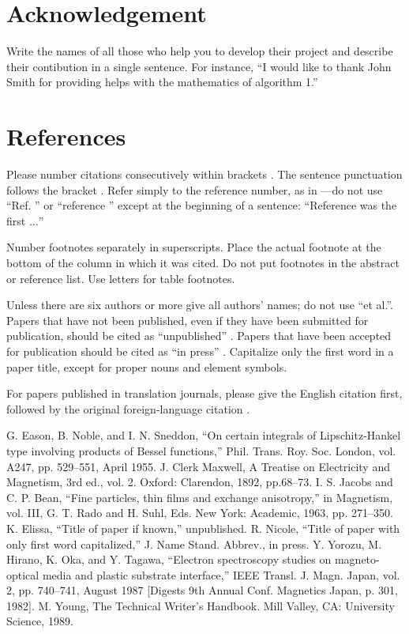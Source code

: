 \documentclass[conference]{IEEEtran}
\begin{document}
\section*{Acknowledgement}

Write the names of all those who help you to develop their project and describe their contibution in a single sentence. For instance, ``I would like to thank John Smith for providing helps with the mathematics of algorithm 1.''


\section*{References}

Please number citations consecutively within brackets \cite{b1}. The 
sentence punctuation follows the bracket \cite{b2}. Refer simply to the reference 
number, as in \cite{b3}---do not use ``Ref. \cite{b3}'' or ``reference \cite{b3}'' except at 
the beginning of a sentence: ``Reference \cite{b3} was the first $\ldots$''

Number footnotes separately in superscripts. Place the actual footnote at the bottom of the column in which it was cited. Do not put footnotes in the abstract or reference list. Use letters for table footnotes.

Unless there are six authors or more give all authors' names; do not use ``et al.''. Papers that have not been published, even if they have been submitted for publication, should be cited as ``unpublished'' \cite{b4}. Papers that have been accepted for publication should be cited as ``in press'' \cite{b5}. Capitalize only the first word in a paper title, except for proper nouns and element symbols.

For papers published in translation journals, please give the English 
citation first, followed by the original foreign-language citation \cite{b6}.

\begin{thebibliography}{00}
 G. Eason, B. Noble, and I. N. Sneddon, ``On certain integrals of Lipschitz-Hankel type involving products of Bessel functions,'' Phil. Trans. Roy. Soc. London, vol. A247, pp. 529--551, April 1955.
 J. Clerk Maxwell, A Treatise on Electricity and Magnetism, 3rd ed., vol. 2. Oxford: Clarendon, 1892, pp.68--73.
 I. S. Jacobs and C. P. Bean, ``Fine particles, thin films and exchange anisotropy,'' in Magnetism, vol. III, G. T. Rado and H. Suhl, Eds. New York: Academic, 1963, pp. 271--350.
 K. Elissa, ``Title of paper if known,'' unpublished.
 R. Nicole, ``Title of paper with only first word capitalized,'' J. Name Stand. Abbrev., in press.
 Y. Yorozu, M. Hirano, K. Oka, and Y. Tagawa, ``Electron spectroscopy studies on magneto-optical media and plastic substrate interface,'' IEEE Transl. J. Magn. Japan, vol. 2, pp. 740--741, August 1987 [Digests 9th Annual Conf. Magnetics Japan, p. 301, 1982].
 M. Young, The Technical Writer's Handbook. Mill Valley, CA: University Science, 1989.
\end{thebibliography}
\end{document}
